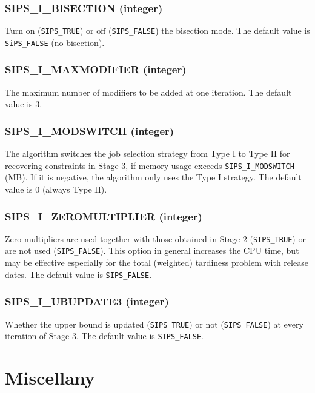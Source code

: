 \documentclass[a4paper]{book}
\begin{document}
\hypertarget{BISECTION}{%
\subsection{SIPS\_I\_BISECTION (integer)}
}

Turn on (\verb+SIPS_TRUE+) or off (\verb+SIPS_FALSE+) the bisection mode.
The default value is \verb+SiPS_FALSE+ (no bisection).

\hypertarget{MAXMODIFIER}{%
\subsection{SIPS\_I\_MAXMODIFIER (integer)}
}

The maximum number of modifiers to be added at one iteration.
The default value is 3.

\hypertarget{MODSWITCH}{%
\subsection{SIPS\_I\_MODSWITCH (integer)}
}

The algorithm switches the job selection strategy from Type I to Type II for recovering constraints in Stage 3, if memory usage exceeds \verb+SIPS_I_MODSWITCH+ (MB).
If it is negative, the algorithm only uses the Type I strategy.
The default value is 0 (always Type II).

\hypertarget{ZEROMULTIPLIER}{%
\subsection{SIPS\_I\_ZEROMULTIPLIER (integer)}
}

Zero multipliers are used together with those obtained in Stage 2 (\verb+SIPS_TRUE+) or are not used (\verb+SIPS_FALSE+).
This option in general increases the CPU time, but may be effective especially for the total (weighted) tardiness problem with release dates.
The default value is \verb+SIPS_FALSE+.

\hypertarget{UBUPDATE3}{%
\subsection{SIPS\_I\_UBUPDATE3 (integer)}
}

Whether the upper bound is updated (\verb+SIPS_TRUE+) or not (\verb+SIPS_FALSE+) at every iteration of Stage 3.
The default value is \verb+SIPS_FALSE+.

\chapter{Miscellany}
\end{document}
